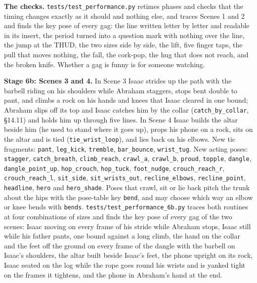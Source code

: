 \documentclass[
  12pt,
  letterpaper,
]{book}
\begin{document}
\textbf{The checks.} \texttt{tests/test\_performance.py} retimes phases
and checks that the timing changes exactly as it should and nothing
else, and traces Scenes 1 and 2 and finds the key pose of every gag:
the line written letter by letter and readable in its insert, the
period turned into a question mark with nothing over the line, the jump
at the THUD, the two sizes side by side, the lift, five finger taps,
the pull that moves nothing, the fall, the cork-pop, the hug that does
not reach, and the broken knife. Whether a gag is funny is for someone
watching.

\textbf{Stage 6b: Scenes 3 and 4.} In Scene 3 Isaac strides up the path
with the barbell riding on his shoulders while Abraham staggers, stops
bent double to pant, and climbs a rock on his hands and knees that Isaac
cleared in one bound; Abraham slips off its top and Isaac catches him by
the collar (\texttt{catch\_by\_collar}, \S14.11) and holds him up
through five lines. In Scene 4 Isaac builds the altar beside him (he
used to stand where it goes up), props his phone on a rock, sits on the
altar and is tied (\texttt{tie\_wrist\_loop}), and lies back on his
elbows. New tic fragments: \texttt{pant}, \texttt{leg\_kick},
\texttt{tremble}, \texttt{bar\_bounce}, \texttt{wrist\_tug}. New acting
poses: \texttt{stagger}, \texttt{catch\_breath}, \texttt{climb\_reach},
\texttt{crawl\_a}, \texttt{crawl\_b},
\texttt{proud}, \texttt{topple}, \texttt{dangle},
\texttt{dangle\_point\_up}, \texttt{hop\_crouch}, \texttt{hop\_tuck},
\texttt{foot\_nudge}, \texttt{crouch\_reach\_r},
\texttt{crouch\_reach\_l}, \texttt{sit\_side},
\texttt{sit\_wrists\_out}, \texttt{recline\_elbows},
\texttt{recline\_point}, \texttt{headline}, \texttt{hero} and
\texttt{hero\_shade}. Poses that crawl, sit or lie back pitch the trunk
about the hips with the pose-table key \texttt{bend}, and may choose
which way an elbow or knee bends with \texttt{bends}.
\texttt{tests/test\_performance\_6b.py} traces both routines at four
combinations of sizes and finds the key pose of every gag of the two
scenes: Isaac moving on every frame of his stride while Abraham stops,
Isaac still while his father pants, one bound against a long climb, the
hand on the collar and the feet off the ground on every frame of the
dangle with the barbell on Isaac's shoulders, the altar built beside
Isaac's feet, the phone upright on its rock, Isaac seated on the log
while the rope goes round his wrists and is yanked tight on the frames
it tightens, and the phone in Abraham's hand at the end.
\end{document}
